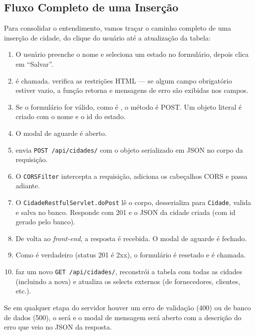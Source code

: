 \subsection{Fluxo Completo de uma Inserção}

Para consolidar o entendimento, vamos traçar o caminho completo de uma inserção de cidade, do clique do usuário até a atualização da tabela:

\begin{enumerate}
    \item O usuário preenche o nome e seleciona um estado no formulário, depois clica em ``Salvar''.
    \item {} é chamada.  verifica as restrições HTML --- se algum campo obrigatório estiver vazio, a função retorna  e mensagens de erro são exibidas nos campos.
    \item Se o formulário for válido, como  é , o método é POST. Um objeto literal é criado com o nome e o id do estado.
    \item O modal de aguarde é aberto.
    \item {} envia \texttt{POST /api/cidades/} com o objeto serializado em JSON no corpo da requisição.
    \item O \texttt{CORSFilter} intercepta a requisição, adiciona os cabeçalhos CORS e passa adiante.
    \item O \texttt{CidadeRestfulServlet.doPost} lê o corpo, desserializa para \texttt{Cidade}, valida e salva no banco. Responde com 201 e o JSON da cidade criada (com id gerado pelo banco).
    \item De volta ao \textit{front-end}, a resposta é recebida. O modal de aguarde é fechado.
    \item Como  é verdadeiro (status 201 é 2xx), o formulário é resetado e  é chamada.
    \item {} faz um novo \texttt{GET /api/cidades/}, reconstrói a tabela com todas as cidades (incluindo a nova) e atualiza os selects externos (de fornecedores, clientes, etc.).
\end{enumerate}

Se em qualquer etapa do servidor houver um erro de validação (400) ou de banco de dados (500), o  será  e o modal de mensagem será aberto com a descrição do erro que veio no JSON da resposta.


